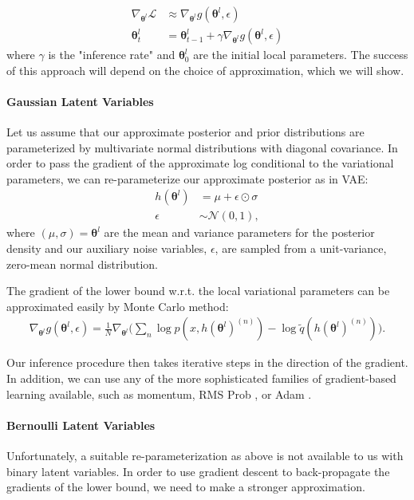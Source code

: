 \documentclass{article} %
\newcommand{\vects}[1]{\boldsymbol{#1}}
\newcommand{\TT}[0]{\vects{\theta}}
\newcommand{\grad}[0]{\nabla}
\newcommand{\LL}[0]{\mathcal{L}}
\newcommand{\NN}[0]{\mathcal{N}}
\begin{document}
\begin{align}
\grad_{\TT^l} \LL &\approx \grad_{\TT^l} g(\TT^l, \epsilon) \nonumber \\
\TT^l_t &= \TT^l_{t-1} + \gamma \grad_{\TT^l} g(\TT^l, \epsilon)
\end{align}
where $\gamma$ is the "inference rate" and $\TT^l_0$ are the initial local
parameters. The success of this approach will depend on the choice of approximation, which we will show.

\paragraph{Gaussian Latent Variables}

Let us assume that our approximate posterior and prior distributions are
parameterized by multivariate normal distributions with diagonal covariance. In
order to pass the gradient of the approximate log conditional to the variational
parameters, we can re-parameterize our approximate posterior as in VAE:
\begin{align}
h(\TT^l) &= \mu + \epsilon \odot \sigma \nonumber \\
\epsilon &\sim \NN(0, 1),
\end{align}
where $(\mu, \sigma) = \TT^l$ are the mean and variance parameters for the
posterior density and our auxiliary noise variables, $\epsilon$, are sampled
from a unit-variance, zero-mean normal distribution.

The gradient of the lower bound w.r.t. the local variational parameters can be
approximated easily by Monte Carlo method:
\begin{align}
\grad_{\TT^l} g(\TT^l, \epsilon) = \frac{1}{N} \grad_{\TT^l} \bigg(\sum_n \log p(x, h(\TT^l)^{(n)}) - \log \tilde{q}(h(\TT^l)^{(n)})\bigg).
\end{align}

Our inference procedure then takes iterative steps in the direction of the gradient. In addition, we can use any of the more sophisticated families of gradient-based learning available, such as momentum, RMS Prob \citep{Hinton-Coursera2012}, or Adam \citep{kingma2014method}.

\paragraph{Bernoulli Latent Variables}
Unfortunately, a suitable re-parameterization as above is not available to us
with binary latent variables. In order to use gradient descent to back-propagate
the gradients of the lower bound, we need to make a stronger approximation. 
\end{document}
